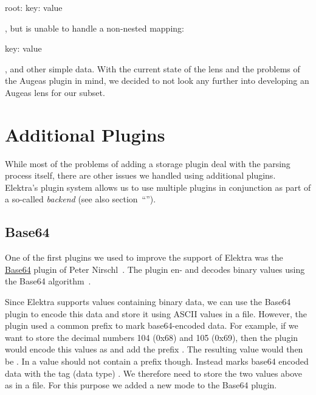 \begin{yamlcode}
  root:
    key: value
\end{yamlcode}

, but is unable to handle a non-nested mapping:

\begin{yamlcode}
  key: value
\end{yamlcode}

, and other simple data. With the current state of the  lens and the problems of the Augeas plugin in mind, we decided to not look any further into developing an Augeas lens for our  subset.

\section{Additional Plugins}

While most of the problems of adding a  storage plugin deal with the parsing process itself, there are other issues we handled using additional plugins. Elektra’s plugin system allows us to use multiple plugins in conjunction as part of a so-called \emph{backend} (see also section~“”).

\subsection{Base64}
\label{sec:base64}

One of the first plugins we used to improve the  support of Elektra was the \href{https://www.libelektra.org/plugins/base64}{Base64} plugin of Peter Nirschl~\cite{nirschl2018crypto}. The plugin en- and decodes binary values using the Base64 algorithm~\cite{josefsson2006base16}.

Since Elektra supports values containing binary data, we can use the Base64 plugin to encode this data and store it using ASCII values in a  file. However, the plugin used a common prefix to mark base64-encoded data. For example, if we want to store the decimal numbers 104 (0x68) and 105 (0x69), then the plugin would encode this values as  and add the prefix . The resulting value would then be . In  a value should not contain a prefix though. Instead  marks base64 encoded data with the tag (data type) . We therefore need to store the two values above as  in a  file. For this purpose we added a new mode to the Base64 plugin.

